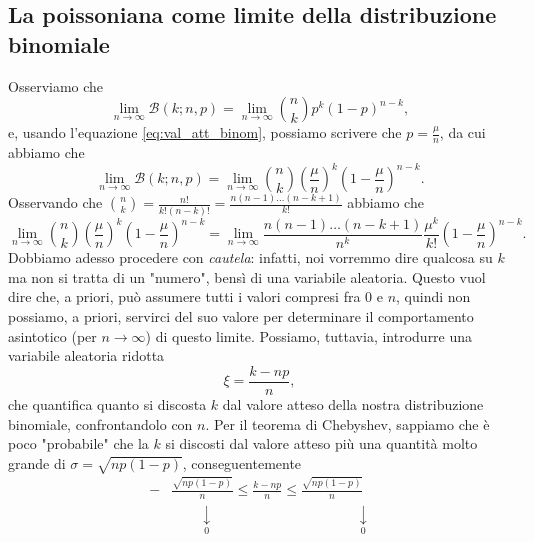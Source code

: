 \documentclass{report}
\begin{document}
\subsection{La poissoniana come limite della distribuzione binomiale}
\begin{myproof}
Osserviamo che
$$
\lim_{n \to \infty} \mathcal{B}(k; n, p) = \lim_{n \to \infty} \binom{n}{k} p^k (1-p)^{n-k},
$$
e, usando l'equazione \ref{eq:val_att_binom}, possiamo scrivere che $p = \frac{\mu}{n}$, da cui abbiamo che
$$
	\lim_{n \to \infty} \mathcal{B}(k; n, p) = \lim_{n \to \infty} \binom{n}{k} \left( \frac{\mu}{n} \right)^k \left( 1-\frac{\mu}{n} \right)^{n-k}.
$$
Osservando che $\binom{n}{k} = \frac{n!}{k!(n-k)!} = \frac{n(n-1) \ldots (n-k+1)}{k!}$ abbiamo che
$$
	\lim_{n \to \infty} \binom{n}{k} \left( \frac{\mu}{n} \right)^k \left( 1-\frac{\mu}{n} \right)^{n-k} = \lim_{n \to \infty} \frac{n(n-1)\ldots (n-k+1)}{n^k} \frac{\mu^k}{k!} \left( 1 - \frac{\mu}{n} \right)^{n-k}.
$$
Dobbiamo adesso procedere con \emph{cautela}: infatti, noi vorremmo dire qualcosa su $k$ ma non si tratta di un "numero", bensì di una variabile aleatoria. Questo vuol dire che, a priori, può assumere tutti i valori compresi fra 0 e $n$, quindi non possiamo, a priori, servirci del suo valore per determinare il comportamento asintotico (per $n \to \infty$) di questo limite. Possiamo, tuttavia, introdurre una variabile aleatoria ridotta
\begin{equation}
	\xi = \frac{k - np}{n},
	\label{eq:xi_cas_rid}
\end{equation}
che quantifica quanto si discosta $k$ dal valore atteso della nostra distribuzione binomiale, confrontandolo con $n$. Per il teorema di Chebyshev, sappiamo che è poco "probabile" che la $k$ si discosti dal valore atteso più una quantità molto grande di $\sigma = \sqrt{np(1-p)}$, conseguentemente
\begin{align*}
    -&\frac{\sqrt{np(1-p)}}{n} \leq \frac{k - np}{n} \leq \frac{\sqrt{np(1-p)}}{n} \\
    &\, \, \, \, \, \, \, \, \, \, \, \, \underset{0}{\downarrow} \phantom{\leq} \phantom{\frac{k - np}{n}} \phantom{\leq} \, \, \, \, \, \, \, \, \, \, \, \, \, \, \, \, \, \, \, \, \, \, \, \, \, \, \, \, \, \, \, \, \underset{0}{\downarrow}

\end{align*}
\end{myproof}
\end{document}
